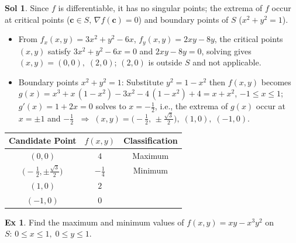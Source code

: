 \documentclass[12pt]{extarticle}
\newcommand{\ds}{\displaystyle}
\newcommand{\ie}{\;\Longrightarrow\;}
\theoremstyle{definition}
\newtheorem*{ex}{Ex}
\newtheorem*{sol}{Sol}
\newcommand{\vc}{\mathbf{c}}
\begin{document}
\begin{sol}
  Since $f$ is differentiable, it has no singular points; the extrema of $f$ occur at critical points ($\vc\in S,\,\nabla f(\vc) = 0$) and boundary points of $S$ ($x^2 + y^2 = 1$). 
  \begin{itemize}\setlength\itemsep{0em}
    \item From $\ds f_x(x, y) = 3x^2 + y^2 - 6x$, $\ds f_y(x, y) = 2xy - 8y$, the critical points $(x, y)$ satisfy $\ds 3x^2 + y^2 - 6x = 0$ and $2xy - 8y = 0$, solving gives $(x, y) = (0, 0),\;(2, 0)$; $(2, 0)$ is outside $S$ and not applicable. 
    \item Boundary points $x^2 + y^2 = 1$: Substitute $y^2 = 1 - x^2$ then $f(x, y)$ becomes $g(x) = x^3 + x\,(1 - x^2) - 3x^2 - 4\,(1 - x^2) + 4 = x + x^2$, $-1\leqslant x\leqslant 1$; $g'(x) = 1 + 2x = 0$ solves to $x = -\frac{1}{2}$, i.e., the extrema of $g(x)$ occur at $x = \pm 1$ and $-\frac{1}{2}$ $\ie (x, y) = \big(-\frac{1}{2},\,\pm\frac{\sqrt{3}}{2}\big),\;(1, 0),\;(-1, 0)$.  
  \end{itemize}
  \begin{center}
  \renewcommand{\arraystretch}{1.3}
  \begin{tabular}{ccc}
    \toprule
    Candidate Point & $f(x, y)$ & Classification \\    
    \midrule
    $(0, 0)$  & $4$ & Maximum \\ 
    $\big(-\frac{1}{2}, \pm\frac{\sqrt{3}}{2}\big)$  & $-\frac{1}{4}$ & Minimum \\ 
    $(1, 0)$  & $2$ &  \\ 
    $(-1, 0)$ & $0$ &  \\ \bottomrule
  \end{tabular}
  \renewcommand{\arraystretch}{1.0}
  \end{center}
\end{sol}

\begin{ex}
  Find the maximum and minimum values of $\ds f(x, y) = xy - x^3y^2$ on $S:\, 0\leqslant x\leqslant 1,\;0\leqslant y\leqslant 1$. 
\end{ex}
\end{document}
